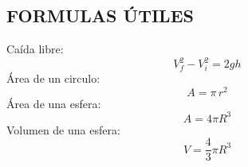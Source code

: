 \documentclass[letter,oneside,10pt]{article}
\begin{document}
\thispagestyle{empty}
\begin{multicols}{3}

\scriptsize
\section*{FORMULAS ÚTILES}
Caída libre:
\vspace{-0.3cm}
\begin{equation*}
    V_f^2 - V_i^2 = 2gh
\end{equation*}
Área de un circulo:
\vspace{-0.3cm}
\begin{equation*}
    A = \pi\,r^2
\end{equation*}
Área de una esfera:
\vspace{-0.3cm}
\begin{equation*}
    A = 4\pi R^3
\end{equation*}
Volumen de una esfera:
\vspace{-0.3cm}
\begin{equation*}
    V = \frac{4}{3}\pi R^3
\end{equation*}


\end{multicols}
\end{document}
